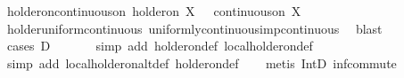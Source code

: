 \begin{isabellebody}
\isamarkupfalse%
%
\endisatagproof
{\isafoldproof}%
%
\isadelimproof
%
\endisadelimproof
\isanewline
\isanewline
{}\isamarkupfalse%
\ holder{\isacharunderscore}{\kern0pt}on{\isacharunderscore}{\kern0pt}continuous{\isacharunderscore}{\kern0pt}on{\isacharcolon}{\kern0pt}\ {\isachardoublequoteopen}{\isasymgamma}{\isacharminus}{\kern0pt}holder{\isacharunderscore}{\kern0pt}on\ X\ {\isasymphi}\ {\isasymLongrightarrow}\ continuous{\isacharunderscore}{\kern0pt}on\ X\ {\isasymphi}{\isachardoublequoteclose}\isanewline
%
\isadelimproof
\ \ %
\endisadelimproof
%
\isatagproof
{}\isamarkupfalse%
\ holder{\isacharunderscore}{\kern0pt}uniform{\isacharunderscore}{\kern0pt}continuous\ uniformly{\isacharunderscore}{\kern0pt}continuous{\isacharunderscore}{\kern0pt}imp{\isacharunderscore}{\kern0pt}continuous\ \isamarkupfalse%
\ blast%
\endisatagproof
{\isafoldproof}%
%
\isadelimproof
%
\endisadelimproof
%
%
\isadelimproof
\ \ %
\endisadelimproof
%
\isatagproof
{}\isamarkupfalse%
\ {\isacharparenleft}{\kern0pt}cases\ {\isachardoublequoteopen}D\ {\isacharequal}{\kern0pt}\ {\isacharbraceleft}{\kern0pt}{\isacharbraceright}{\kern0pt}{\isachardoublequoteclose}{\isacharparenright}{\kern0pt}\isanewline
\ \ \ \isamarkupfalse%
\ {\isacharparenleft}{\kern0pt}simp\ add{\isacharcolon}{\kern0pt}\ holder{\isacharunderscore}{\kern0pt}on{\isacharunderscore}{\kern0pt}def\ local{\isacharunderscore}{\kern0pt}holder{\isacharunderscore}{\kern0pt}on{\isacharunderscore}{\kern0pt}def{\isacharparenright}{\kern0pt}\isanewline
\ \ \ \isamarkupfalse%
\ {\isacharparenleft}{\kern0pt}simp\ add{\isacharcolon}{\kern0pt}\ local{\isacharunderscore}{\kern0pt}holder{\isacharunderscore}{\kern0pt}on{\isacharunderscore}{\kern0pt}altdef\ holder{\isacharunderscore}{\kern0pt}on{\isacharunderscore}{\kern0pt}def{\isacharparenright}{\kern0pt}\isanewline
\ \ \isamarkupfalse%
\ {\isacharparenleft}{\kern0pt}metis\ IntD{}\ inf{\isachardot}{\kern0pt}commute{\isacharparenright}{\kern0pt}\isanewline

\end{isabellebody}
